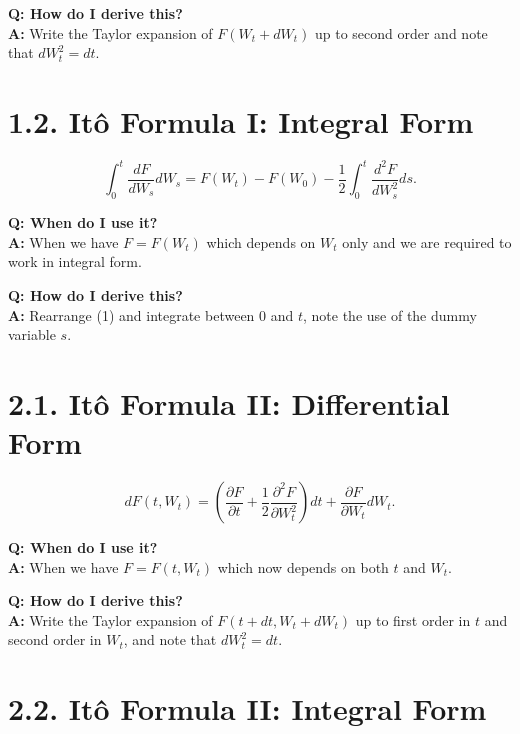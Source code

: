 \documentclass[11pt]{article}
\begin{document}
\textbf{Q: How do I derive this?} \\
\textbf{A:} Write the Taylor expansion of $F(W_t + dW_t)$ up to second order and note that $dW_t^{2} = dt$. 

\vspace{1cm}

\section*{1.2. Itô Formula I: Integral Form}

\begin{equation}
    \int_{0}^{t} \frac{dF}{dW_s} dW_s = F(W_t) - F(W_0) - \frac{1}{2} \int_{0}^{t}  \frac{d^{2} F}{dW_s^{2}} ds.
\end{equation}

\textbf{Q: When do I use it?} \\
\textbf{A:} When we have $F = F(W_t)$ which depends on $W_t$ only and we are required to work in integral form. 

\textbf{Q: How do I derive this?} \\
\textbf{A:} Rearrange (1) and integrate between 0 and $t$, note the use of the dummy variable $s$.

\newpage


\section*{2.1. Itô Formula II: Differential Form}

\begin{equation}
    dF(t, W_t) = \left(\frac{\partial F}{\partial t} + \frac{1}{2} \frac{\partial^{2} F}{\partial W_t^{2}}\right) dt + \frac{\partial F}{\partial W_t} dW_t.
\end{equation}

\textbf{Q: When do I use it?} \\
\textbf{A:} When we have $F = F(t, W_t)$ which now depends on both $t$ and $W_t$. 

\textbf{Q: How do I derive this?} \\
\textbf{A:} Write the Taylor expansion of $F(t+dt, W_t + dW_t)$ up to first order in $t$ and second order in $W_t$, and note that $dW_t^{2} = dt$. 

\vspace{1cm}

\section*{2.2. Itô Formula II: Integral Form}
\end{document}
